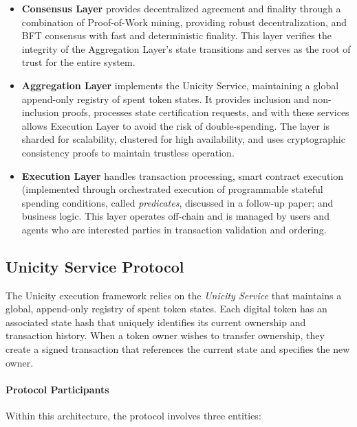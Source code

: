 \documentclass{article}
\begin{document}
\begin{itemize}
\item \textbf{Consensus Layer} provides decentralized agreement and finality through a combination of Proof-of-Work mining, providing robust decentralization, and BFT consensus with fast and deterministic finality. This layer verifies the integrity of the Aggregation Layer's state transitions and serves as the root of trust for the entire system.

\item \textbf{Aggregation Layer} implements the Unicity Service, maintaining a global append-only registry of spent token states. It provides inclusion and non-inclusion proofs, processes state certification requests, and with these services allows Execution Layer to avoid the risk of double-spending. The layer is sharded for scalability, clustered for high availability, and uses cryptographic consistency proofs to maintain trustless operation.

\item \textbf{Execution Layer} handles transaction processing, smart contract execution (implemented through orchestrated execution of programmable stateful spending conditions, called \emph{predicates}, discussed in a follow-up paper\cite{predicates}; and business logic. This layer operates off-chain and is managed by users and agents who are interested parties in transaction validation and ordering.
\end{itemize}

\subsection{Unicity Service Protocol}

The Unicity execution framework relies on the \emph{Unicity Service} that maintains a global, append-only registry of spent token states. Each digital token has an associated state hash that uniquely identifies its current ownership and transaction history. When a token owner wishes to transfer ownership, they create a signed transaction that references the current state and specifies the new owner.

\paragraph{Protocol Participants}
Within this architecture, the protocol involves three entities:
\end{document}
